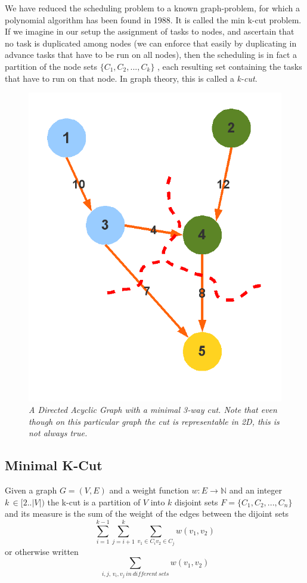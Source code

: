 We have reduced the scheduling problem to a known graph-problem, for which a polynomial algorithm has been found in 1988. It is called the
min k-cut problem. If we imagine in our setup the assignment of tasks to nodes, and ascertain that no task is duplicated among nodes
(we can enforce that easily by duplicating in advance tasks that have to be run on all nodes), then the scheduling is in fact a partition of
the node sets $\{C_1,C_2,...,C_k\}$ , each resulting set containing the tasks that have to run on that node. In graph theory, this is called 
a \textit{k-cut}. 

\begin{figure}[ht]
\begin{center}
 \includegraphics[scale=0.3]{static/dag-cut.png}
\end{center}
\caption{\small \textit{A Directed Acyclic Graph with a minimal 3-way cut. Note that even though on this particular graph the cut is representable in 2D, this
is not always true.}}
\end{figure}

\subsection{Minimal K-Cut}
Given a graph $G=(V,E)$ and a weight function $w:E\rightarrow\mathbb{N}$ and an integer $k\,\in[2..|V|)$ the k-cut is a partition 
of $V$ into $k$ disjoint sets $F=\{C_1,C_2,...,C_n\}$ and its measure is the sum of the weight of the edges between the dijoint sets
\[ \sum_{i=1}^{k-1} \sum_{j=i+1}^{k} \sum_{v_1 \in C_i v_2 \in C_j} w({v_1,v_2}) \]
or otherwise written
\[ \sum_{i,j,\, v_i,v_j\:in\:different\:sets} w({v_1,v_2}) \]

